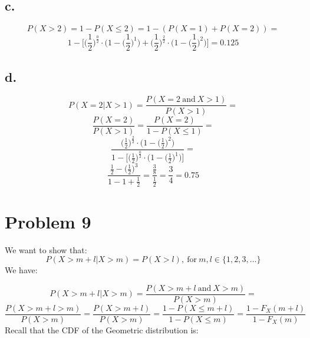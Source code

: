 \documentclass{article}
\begin{document}
\subsection*{c.}

\begin{equation*}
    P(X > 2) = 1 - P(X \leq 2) = 1 - (P(X=1) + P(X=2)) = 
\end{equation*}
\begin{equation*}
    1 - \Bigg[\Big(\frac{1}{2}\Big)^{\frac{0}{2}} \cdot \Bigg(1 - \Big(\frac{1}{2}\Big)^{1}\Bigg) + \Big(\frac{1}{2}\Big)^{\frac{2}{2}} \cdot \Bigg(1 - \Big(\frac{1}{2}\Big)^{2}\Bigg)\Bigg] = 0.125
\end{equation*}

\subsection*{d.}

\begin{equation*}
    P(X = 2|X > 1) = \frac{P(X = 2 \ \mbox{and} \ X > 1)}{P(X > 1)} =
\end{equation*}
\begin{equation*}
    \frac{P(X=2)}{P(X > 1)} = \frac{P(X=2)}{1 - P(X \leq 1)} =
\end{equation*}
\begin{equation*}
    \frac{\Big(\frac{1}{2}\Big)^{\frac{2}{2}} \cdot \Bigg(1 - \Big(\frac{1}{2}\Big)^{2}\Bigg)}{1 - \Bigg[\Big(\frac{1}{2}\Big)^{\frac{0}{2}} \cdot \Bigg(1 - \Big(\frac{1}{2}\Big)^{1}\Bigg)\Bigg]} =
\end{equation*}
\begin{equation*}
    \frac{\frac{1}{2} - \Big(\frac{1}{2}\Big)^{3}}{1 - 1 + \frac{1}{2}} = \frac{\frac{3}{8}}{\frac{1}{2}} = \frac{3}{4} = 0.75
\end{equation*}


\section*{Problem 9}
We want to show that:
\begin{equation*}
    P(X > m + l | X > m) = P(X > l), \ \mbox{for} \ m, l \in \{1,2,3, \dots\}
\end{equation*}
We have:

\begin{equation*}
    P(X > m + l | X > m) = \frac{P(X > m + l \ \mbox{and} \  X > m)}{P(X > m)} =
\end{equation*}
\begin{equation*}
    \frac{P(X > m + l > m)}{P(X > m)} = \frac{P(X > m + l)}{P(X > m)} = \frac{1 - P(X \leq m + l) }{1 - P(X \leq m)} = \frac{1 - F_{X}(m + l)}{1 - F_{X}(m)}
\end{equation*}
Recall that the CDF of the Geometric distribution is:
\end{document}
